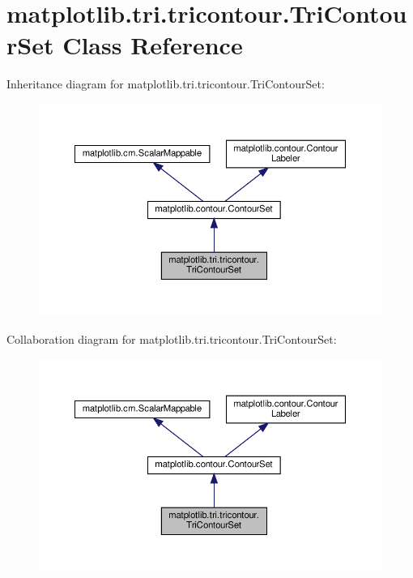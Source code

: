 \hypertarget{classmatplotlib_1_1tri_1_1tricontour_1_1TriContourSet}{}\section{matplotlib.\+tri.\+tricontour.\+Tri\+Contour\+Set Class Reference}
\label{classmatplotlib_1_1tri_1_1tricontour_1_1TriContourSet}


Inheritance diagram for matplotlib.\+tri.\+tricontour.\+Tri\+Contour\+Set\+:
\nopagebreak
\begin{figure}[H]
\begin{center}
\leavevmode
\includegraphics[width=350pt]{classmatplotlib_1_1tri_1_1tricontour_1_1TriContourSet__inherit__graph}
\end{center}
\end{figure}


Collaboration diagram for matplotlib.\+tri.\+tricontour.\+Tri\+Contour\+Set\+:
\nopagebreak
\begin{figure}[H]
\begin{center}
\leavevmode
\includegraphics[width=350pt]{classmatplotlib_1_1tri_1_1tricontour_1_1TriContourSet__coll__graph}
\end{center}
\end{figure}

